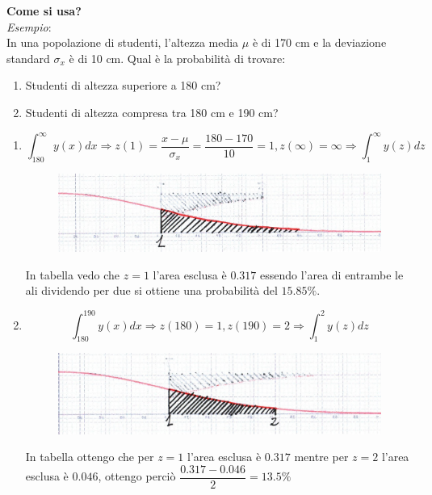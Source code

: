 \documentclass[a4paper, 15pt]{article}
\begin{document}
\begin{adjustwidth}{2in}{}
\begin{figure}[H]
		\label{fig:screenshot007}
	\end{figure}
	\textbf{Come si usa?} \\
	\textit{Esempio}:\\
	In una popolazione di studenti, l’altezza media $\mu$ è di 170 cm e la deviazione standard $\sigma_x$ è di 10 cm. Qual è la probabilità di trovare:	
	\begin{enumerate}		
	\item Studenti di altezza superiore a 180 cm?		
	\item Studenti di altezza compresa tra 180 cm e 190 cm?
	\end{enumerate}
	\begin{enumerate}
		\item \[\int_{180}^{\infty}y(x)dx \Rightarrow z(1) = \dfrac{x-\mu}{\sigma_x} = \dfrac{180-170}{10} = 1, z(\infty)=\infty \Rightarrow \int_{1}^{\infty}y(z)dz \]
\begin{figure}[H]
	\centering
	\includegraphics[width=0.5\linewidth]{fig/mm1}
	\label{fig:mm1}
\end{figure}
		In tabella vedo che $z=1$ l'area esclusa è $0.317$ essendo l'area di entrambe le ali dividendo per due si ottiene una probabilità del $15.85\%$. 
\newpage		
		\item \[\int_{180}^{190}y(x)dx \Rightarrow z(180) =  1, z(190)=2 \Rightarrow \int_{1}^{2}y(z)dz\]
\begin{figure}[H]
	\centering
	\includegraphics[width=0.5\linewidth]{fig/mm2}
	\label{fig:mm2}
\end{figure}		
		In tabella ottengo che per $z=1$ l'area esclusa è $0.317$ mentre per $z=2$ l'area esclusa è $0.046$, ottengo perciò \(\dfrac{0.317 - 0.046 }{2} = 13.5\%\)
	\end{enumerate}
\end{adjustwidth}
\end{document}
